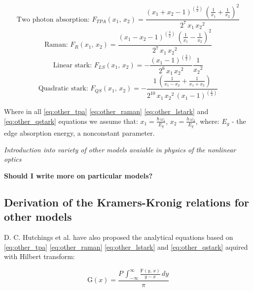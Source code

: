 \documentclass[12pt,twoside,a4paper]{article}
\numberwithin{equation}{subsection}
\numberwithin{figure}{subsection}
\begin{document}
\begin{equation} \label{eq:other_tpa}
  \mbox{Two photon absorption: } F_{TPA} ({x_{1}}, \,{x_{2}}) = \frac {({x_{1}} + {x_{2}} - 1)^{(\frac {3}{2})}\,(\frac
  {1}{{x_{1}}} + \frac {1}{{x_{2}}}) ^{2}} {2^{7}\,{x_{1}}\,{x_{2}}^{2}}
\end{equation}
\begin{equation} \label{eq:other_raman}
  \mbox{Raman: } {F_{R}}({x_{1}}, \,{x_{2}})=\frac {({x_{1}} - {x_{2}} - 1)^{(\frac {3}{2})}\,(\frac {1}{{x_{1}}} - \frac
  {1}{{x_{2}}})^{2}}{2^{7}\,{x_{1}}\,{x_{2}}^{2}}
\end{equation}
\begin{equation} \label{eq:other_lstark}
  \mbox{Linear stark: } {F_{LS}}({x_{1}}, \,{x_{2}})= - \frac {({x_{1}} - 1)^{(\frac {3}{2})}}{2^{6}\,{x_{1}}\,{x_{2}}^{2}} \frac
  {1}{{x_{2}}^{2}}
\end{equation}
\begin{equation} \label{eq:other_qstark}
  \mbox{Quadratic stark: } {F_{QS}}({x_{1}}, \,{x_{2}})= - \frac {1\,(\frac {1}{{x_{1}} - {x_{2}}} + \frac {1}{{x_{1}} +
  {x_{2}}})}{2^{10}\, {x_{1}}\,{x_{2}}^{2}\,({x_{1}} - 1)^{(\frac {1}{2})}}
\end{equation}

Where in all \ref{eq:other_tpa} \ref{eq:other_raman} \ref{eq:other_lstark} and \ref{eq:other_qstark} equations we assume that:
${x_{1}}=\frac {\hbar\,{\omega_{1}}}{{E_{g}}}$, ${x_{2}}=\frac {h\,{\omega_{2}}}{{E_{g}}}$, where: ${E_{g}}$ - the edge absorption
energy, a nonconstant parameter.

\textit{Introduction into variety of other models avaiable in physics of the nonlinear optics}

\textbf{Should I write more on particular models?}

\subsection{Derivation of the Kramers-Kronig relations for other models} \label{chap:problem_dother}


D. C. Hutchings et al. \cite{hutchings_kramers2} have also proposed the analytical equations based on \ref{eq:other_tpa}
\ref{eq:other_raman} \ref{eq:other_lstark} and \ref{eq:other_qstark} aquired with Hilbert transform:


\begin{equation} \label{eq:hother_euqation}
  \mathrm{G}(x)=\frac {P\,\int_{ - \infty }^{\infty }\frac { \mathrm{F}(y, \,x)}{y - x}\,dy}{\pi }
\end{equation}
\end{document}
